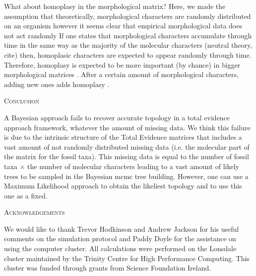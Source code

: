\documentclass[12pt,letterpaper]{article}
\renewcommand{\section}[1]{%
\bigskip
\begin{center}
\begin{Large}
\normalfont\scshape #1
\medskip
\end{Large}
\end{center}}
\begin{document}
What about homoplasy in the morphological matrix?
Here, we made the assumption that theoretically, morphological characters are randomly distributed on an organism however it seems clear that empirical morphological data does not act randomly
If one states that morphological characters accumulate through time in the same way as the majority of the molecular characters (neutral theory, cite) then, homoplasic characters are expected to appear randomly through time.
Therefore, homoplasy is expected to be more important (by chance) in bigger morphological matrices \citep{davalosintegrating2014}.
After a certain amount of morphological characters, adding new ones adds homoplasy \citep{wagner2000}.



%
%


\section{Conclusion}
A Bayesian approach fails to recover accurate topology in a total evidence approach framework, whatever the amount of missing data.
We think this failure is due to the intrinsic structure of the Total Evidence matrices that includes a vast amount of not randomly distributed missing data (i.e. the molecular part of the matrix for the fossil taxa).
This missing data is equal to the number of fossil taxa $\times$ the number of molecular characters leading to a vast amount of likely trees to be sampled in the Bayesian mcmc tree building.
However, one can use a Maximum Likelihood approach to obtain the likeliest topology and to use this one as a fixed.


%
%


\section{Acknowledgements}
We would like to thank Trevor Hodkinson and Andrew Jackson %
for his useful comments on the simulation protocol and Paddy Doyle for the assistance on using the computer cluster.
All calculations were performed on the Lonsdale cluster maintained by the Trinity Centre for High Performance Computing.
This cluster was funded through grants from Science Foundation Ireland.
\end{document}
